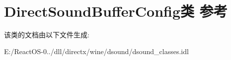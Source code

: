 \hypertarget{class_direct_sound_buffer_config}{}\section{Direct\+Sound\+Buffer\+Config类 参考}
\label{class_direct_sound_buffer_config}


该类的文档由以下文件生成\+:\begin{DoxyCompactItemize}
\item 
E\+:/\+React\+O\+S-\/0../dll/directx/wine/dsound/dsound\+\_\+classes.\+idl\end{DoxyCompactItemize}
